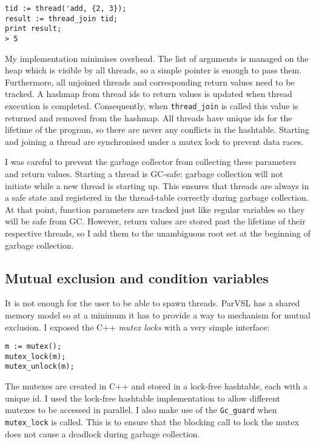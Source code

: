 \begin{verbatim}
tid := thread('add, {2, 3});
result := thread_join tid;
print result;
> 5
\end{verbatim}

My implementation minimises overhead. The list of arguments is managed on the heap which is visible by all
threads, so a simple pointer is enough to pass them. Furthermore, all unjoined threads and corresponding return values
need to be tracked.
A hashmap from thread ids to return values is updated when thread execution is completed.
Consequently, when \verb|thread_join| is called this value is returned and removed from the hashmap. All threads
have unique ids for the lifetime of the program, so there are never any conflicts in the hashtable.
Starting and joining a thread are synchronised under a mutex lock to prevent data races.

I was careful to prevent the garbage collector from collecting these parameters and return values.
Starting a thread is GC-safe: garbage collection will not initiate while a new thread is starting up. This ensures
that threads are always in a safe state and registered in the thread-table correctly during garbage collection.
At that point, function parameters are tracked just like regular variables so they will be safe from GC.
However, return values are stored past the lifetime of their respective threads, so I add them
to the unambiguous root set at the beginning of garbage collection.

\subsection{Mutual exclusion and condition variables}

It is not enough for the user to be able to spawn threads. ParVSL has a shared memory model so at a minimum
it has to provide a way to mechanism for mutual exclusion. I exposed the C++ \emph{mutex locks}
with a very simple interface:

\begin{verbatim}
m := mutex();
mutex_lock(m);
mutex_unlock(m);
\end{verbatim}

The mutexes are created in C++ and stored in a lock-free hashtable, each with a unique id. I used the lock-free
hashtable implementation to allow different mutexes to be accessed in parallel. I also
make use of the \verb|Gc_guard| when \verb|mutex_lock| is called. This is to ensure that the blocking
call to lock the mutex does not cause a deadlock during garbage collection.

